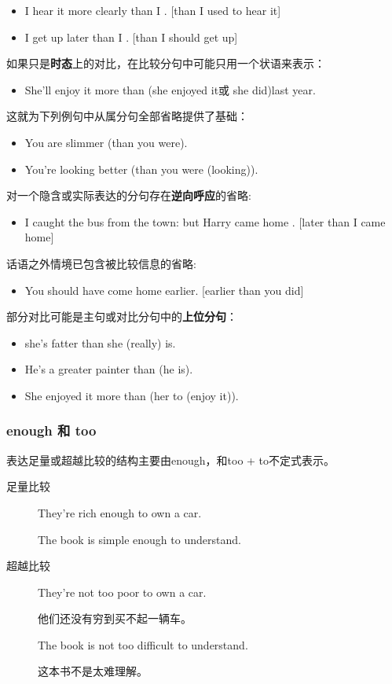 \begin{itemize}
\item I hear it more clearly than I . [than I used to hear it]

\item I get up later than I . [than I should get up]
\end{itemize}

如果只是\textbf{时态}上的对比，在比较分句中可能只用一个状语来表示：
\begin{itemize}
\item She'll enjoy it more than (she enjoyed it或 she did)last year.
\end{itemize}
这就为下列例句中从属分句全部省略提供了基础：
\begin{itemize}
\item You are slimmer (than you were).
\item You're looking better (than you were (looking)).
\end{itemize}

对一个隐含或实际表达的分句存在\textbf{逆向呼应}的省略:
\begin{itemize}
\item I caught the bus from the town: but Harry came home . [later than I came home]
\end{itemize}


话语之外情境已包含被比较信息的省略:
\begin{itemize}
\item You should have come home earlier. [earlier than you did]
\end{itemize}

部分对比可能是主句或对比分句中的\textbf{上位分句}：
\begin{itemize}
\item {} she's fatter than she (really) is.
\item He's a greater painter than  (he is).
\item She enjoyed it more than  (her to (enjoy it)).
\end{itemize}

\subsubsection{enough 和 too}

表达足量或超越比较的结构主要由enough，和too + to不定式表示。
\begin{description}
\item[足量比较] They're rich enough to own a car.

  The book is simple enough to understand.

\item[超越比较] They're not too poor to own a car.

  他们还没有穷到买不起一辆车。

  The book is not too difficult to understand.

  这本书不是太难理解。
\end{description}

